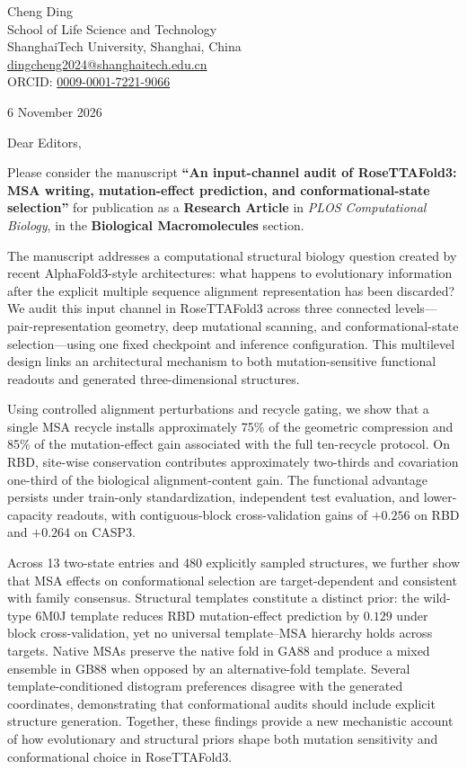 \documentclass[11pt,a4paper]{article}
\begin{document}
Cheng Ding\\
School of Life Science and Technology\\
ShanghaiTech University, Shanghai, China\\
\href{mailto:dingcheng2024@shanghaitech.edu.cn}{dingcheng2024@shanghaitech.edu.cn}\\
ORCID: \href{https://orcid.org/0009-0001-7221-9066}{0009-0001-7221-9066}

6 November 2026

Dear Editors,

Please consider the manuscript \textbf{``An input-channel audit of RoseTTAFold3: MSA writing, mutation-effect prediction, and conformational-state selection''} for publication as a \textbf{Research Article} in \textit{PLOS Computational Biology}, in the \textbf{Biological Macromolecules} section.

The manuscript addresses a computational structural biology question created by recent AlphaFold3-style architectures: what happens to evolutionary information after the explicit multiple sequence alignment representation has been discarded? We audit this input channel in RoseTTAFold3 across three connected levels---pair-representation geometry, deep mutational scanning, and conformational-state selection---using one fixed checkpoint and inference configuration. This multilevel design links an architectural mechanism to both mutation-sensitive functional readouts and generated three-dimensional structures.

Using controlled alignment perturbations and recycle gating, we show that a single MSA recycle installs approximately 75\% of the geometric compression and 85\% of the mutation-effect gain associated with the full ten-recycle protocol. On RBD, site-wise conservation contributes approximately two-thirds and covariation one-third of the biological alignment-content gain. The functional advantage persists under train-only standardization, independent test evaluation, and lower-capacity readouts, with contiguous-block cross-validation gains of $+0.256$ on RBD and $+0.264$ on CASP3.

Across 13 two-state entries and 480 explicitly sampled structures, we further show that MSA effects on conformational selection are target-dependent and consistent with family consensus. Structural templates constitute a distinct prior: the wild-type 6M0J template reduces RBD mutation-effect prediction by $0.129$ under block cross-validation, yet no universal template--MSA hierarchy holds across targets. Native MSAs preserve the native fold in GA88 and produce a mixed ensemble in GB88 when opposed by an alternative-fold template. Several template-conditioned distogram preferences disagree with the generated coordinates, demonstrating that conformational audits should include explicit structure generation. Together, these findings provide a new mechanistic account of how evolutionary and structural priors shape both mutation sensitivity and conformational choice in RoseTTAFold3.
\end{document}
